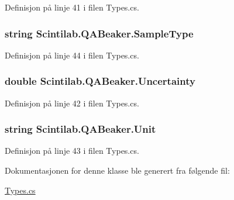 Definisjon på linje 41 i filen Types.\+cs.

\hypertarget{class_scintilab_1_1_q_a_beaker_af2ac680964020fb89f416fd2ceb13174}{
\subsubsection[{Sample\+Type}]{\setlength{\rightskip}{0pt plus 5cm}string Scintilab.\+Q\+A\+Beaker.\+Sample\+Type}}\label{class_scintilab_1_1_q_a_beaker_af2ac680964020fb89f416fd2ceb13174}


Definisjon på linje 44 i filen Types.\+cs.

\hypertarget{class_scintilab_1_1_q_a_beaker_ac707f692dff62a12864abf366abb44d7}{
\subsubsection[{Uncertainty}]{\setlength{\rightskip}{0pt plus 5cm}double Scintilab.\+Q\+A\+Beaker.\+Uncertainty}}\label{class_scintilab_1_1_q_a_beaker_ac707f692dff62a12864abf366abb44d7}


Definisjon på linje 42 i filen Types.\+cs.

\hypertarget{class_scintilab_1_1_q_a_beaker_a9624cfb3bb98340b96370e255b04a1a2}{
\subsubsection[{Unit}]{\setlength{\rightskip}{0pt plus 5cm}string Scintilab.\+Q\+A\+Beaker.\+Unit}}\label{class_scintilab_1_1_q_a_beaker_a9624cfb3bb98340b96370e255b04a1a2}


Definisjon på linje 43 i filen Types.\+cs.



Dokumentasjonen for denne klasse ble generert fra følgende fil\+:\begin{DoxyCompactItemize}
\item 
\hyperlink{_types_8cs}{Types.\+cs}\end{DoxyCompactItemize}
